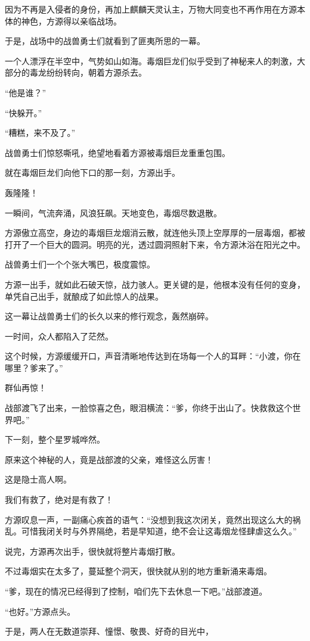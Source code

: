 \begin{this_body}
因为不再是入侵者的身份，再加上麒麟天灵认主，万物大同变也不再作用在方源本体的神色，方源得以亲临战场。

于是，战场中的战兽勇士们就看到了匪夷所思的一幕。

一个人漂浮在半空中，气势如山如海。毒烟巨龙们似乎受到了神秘来人的刺激，大部分的毒龙纷纷转向，朝着方源杀去。

“他是谁？”

“快躲开。”

“糟糕，来不及了。”

战兽勇士们惊怒嘶吼，绝望地看着方源被毒烟巨龙重重包围。

就在毒烟巨龙们向他下口的那一刻，方源出手。

轰隆隆！

一瞬间，气流奔涌，风浪狂飙。天地变色，毒烟尽数退散。

方源傲立高空，身边的毒烟巨龙烟消云散，就连他头顶上空厚厚的一层毒烟，都被打开了一个巨大的圆洞。明亮的光，透过圆洞照射下来，令方源沐浴在阳光之中。

战兽勇士们一个个张大嘴巴，极度震惊。

方源一出手，就如此石破天惊，战力骇人。更关键的是，他根本没有任何的变身，单凭自己出手，就酿成了如此惊人的战果。

这一幕让战兽勇士们的长久以来的修行观念，轰然崩碎。

一时间，众人都陷入了茫然。

这个时候，方源缓缓开口，声音清晰地传达到在场每一个人的耳畔：“小渡，你在哪里？爹来了。”

群仙再惊！

战部渡飞了出来，一脸惊喜之色，眼泪横流：“爹，你终于出山了。快救救这个世界吧。”

下一刻，整个星罗城哗然。

原来这个神秘的人，竟是战部渡的父亲，难怪这么厉害！

这是隐士高人啊。

我们有救了，绝对是有救了！

方源叹息一声，一副痛心疾首的语气：“没想到我这次闭关，竟然出现这么大的祸乱。可惜我闭关时与外界隔绝，若是早知道，绝不会让这毒烟龙怪肆虐这么久。”

说完，方源再次出手，很快就将整片毒烟打散。

不过毒烟实在太多了，蔓延整个洞天，很快就从别的地方重新涌来毒烟。

“爹，现在的情况已经得到了控制，咱们先下去休息一下吧。”战部渡道。

“也好。”方源点头。

于是，两人在无数道崇拜、憧憬、敬畏、好奇的目光中，

\end{this_body}

